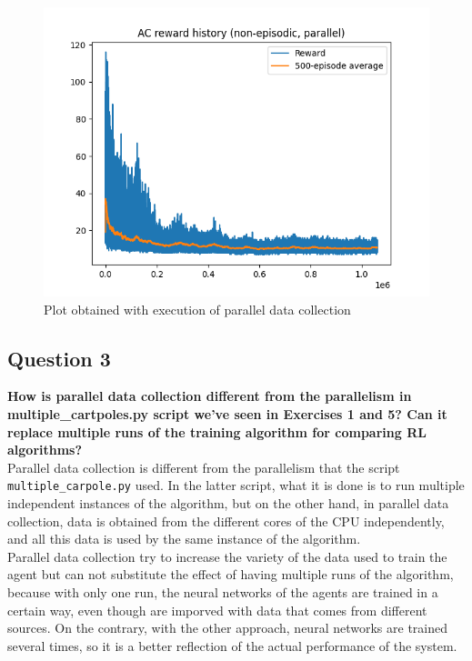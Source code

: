 \documentclass[12pt]{article}
\begin{document}
\begin{figure}[ht]
    \centering
    \includegraphics[scale=0.5]{exercise-6/plots/task-3.png}
    \caption{Plot obtained with execution of parallel data collection}
    \label{fig:task-3}
\end{figure}

\subsection{Question 3}
\textbf{How is parallel data collection different from the parallelism in multiple\_cartpoles.py script we’ve seen in Exercises 1 and 5? Can it replace multiple runs of the training algorithm for comparing RL algorithms?}\\

Parallel data collection is different from the parallelism that the script \texttt{multiple\_carpole.py} used. In the latter script, what it is done is to run multiple independent instances of the algorithm, but on the other hand, in parallel data collection, data is obtained from the different cores of the CPU independently, and all this data is used by the same instance of the algorithm.\\

Parallel data collection try to increase the variety of the data used to train the agent but can not substitute the effect of having multiple runs of the algorithm, because with only one run, the neural networks of the agents are trained in a certain way, even though are imporved with data that comes from different sources. On the contrary, with the other approach, neural networks are trained several times, so it is a better reflection of the actual performance of the system.
\end{document}

